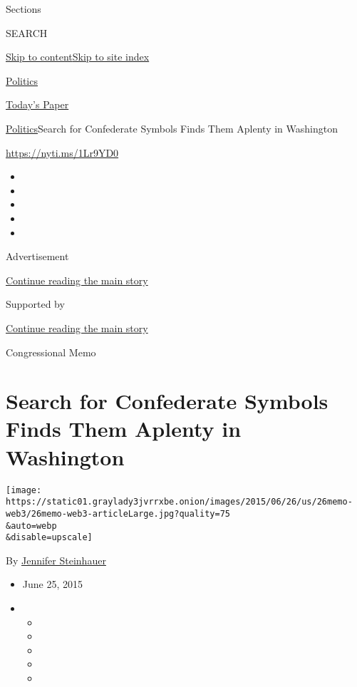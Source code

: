 Sections

SEARCH

\protect\hyperlink{site-content}{Skip to
content}\protect\hyperlink{site-index}{Skip to site index}

\href{https://www.nytimes3xbfgragh.onion/section/politics}{Politics}

\href{https://myaccount.nytimes3xbfgragh.onion/auth/login?response_type=cookie\&client_id=vi}{}

\href{https://www.nytimes3xbfgragh.onion/section/todayspaper}{Today's
Paper}

\href{/section/politics}{Politics}\textbar{}Search for Confederate
Symbols Finds Them Aplenty in Washington

\url{https://nyti.ms/1Lr9YD0}

\begin{itemize}
\item
\item
\item
\item
\item
\end{itemize}

Advertisement

\protect\hyperlink{after-top}{Continue reading the main story}

Supported by

\protect\hyperlink{after-sponsor}{Continue reading the main story}

Congressional Memo

\hypertarget{search-for-confederate-symbols-finds-them-aplenty-in-washington}{%
\section{Search for Confederate Symbols Finds Them Aplenty in
Washington}\label{search-for-confederate-symbols-finds-them-aplenty-in-washington}}

\texttt{[image: https://static01.graylady3jvrrxbe.onion/images/2015/06/26/us/26memo-web3/26memo-web3-articleLarge.jpg?quality=75\\\&auto=webp\\\&disable=upscale]}

By
\href{http://www.nytimes3xbfgragh.onion/by/jennifer-steinhauer}{Jennifer
Steinhauer}

\begin{itemize}
\item
  June 25, 2015
\item
  \begin{itemize}
  \item
  \item
  \item
  \item
  \item
  \end{itemize}
\end{itemize}

